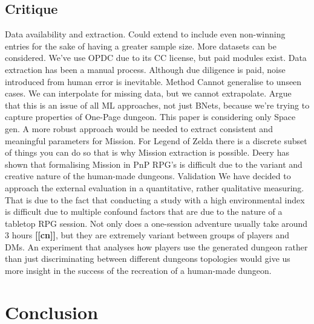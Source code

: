 \documentclass{UoYCSproject}
\begin{document}
\section{Critique}
\begin{outline}[enumerate]
  \1 Data
    \2 availability and extraction. 
      \3 Could extend to include even non-winning entries for the sake of having a greater sample size. More datasets can be considered. We've use OPDC due to its CC license, but paid modules exist.
      \3 Data extraction has been a manual process. Although due diligence is paid, noise introduced from human error is inevitable. 
  \1 Method
    \2 Cannot generalise to unseen cases. We can interpolate for missing data, but we cannot extrapolate. Argue that this is an issue of all ML approaches, not just BNets, because we're trying to capture properties of One-Page dungeon.
    \2 This paper is considering only Space gen. A more robust approach would be needed to extract consistent and meaningful parameters for Mission. For Legend of Zelda there is a discrete subset of things you can do so that is why Mission extraction is possible. Deery has shown that formalising Mission in PnP RPG's is difficult due to the variant and creative nature of the human-made dungeons.
  \1 Validation
    \2 We have decided to approach the external evaluation in a quantitative, rather qualitative measuring. That is due to the fact that conducting a study with a high environmental index is difficult due to multiple confound factors that are due to the nature of a tabletop RPG session. Not only does a one-session adventure usually take around 3 hours \textbf{[[cn]]}, but they are extremely variant between groups of players and DMs. An experiment that analyses how players use the generated dungeon rather than just discriminating between different dungeons topologies would give us more insight in the success of the recreation of a human-made dungeon.
  
\end{outline}



\chapter{Conclusion}
\label{cha:conclusion}
\end{document}
